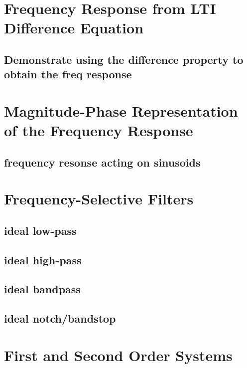 \documentclass{article}
\begin{document}
\section{Frequency Response from LTI Difference Equation}
\label{sec:org9ac773f}

\subsection{Demonstrate using the difference property to obtain the freq response}
\label{sec:org806c699}

\newpage
\section{Magnitude-Phase Representation of the Frequency Response}
\label{sec:org24cb5f9}

\subsection{frequency resonse acting on sinusoids}
\label{sec:org1c9e86b}

\newpage
\section{Frequency-Selective Filters}
\label{sec:org81f7538}

\subsection{ideal low-pass}
\label{sec:orgcbfe22d}

\subsection{ideal high-pass}
\label{sec:org6e357c1}

\subsection{ideal bandpass}
\label{sec:orgc658523}

\subsection{ideal notch/bandstop}
\label{sec:org55a34c1}

\newpage
\section{First and Second Order Systems}
\label{sec:org9c7c5a8}
\end{document}
